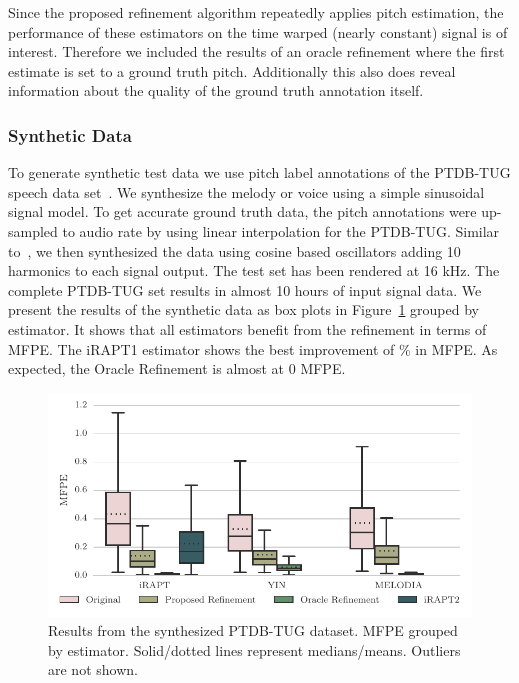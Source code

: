 %
Since the proposed refinement algorithm repeatedly applies pitch estimation, the performance of these estimators on the time warped (nearly constant) signal is of interest. Therefore we included the results of an oracle refinement where the first estimate is set to a ground truth pitch. Additionally this also does reveal information about the quality of the ground truth annotation itself.

\vspace{-0.6em}
\subsubsection{Synthetic Data} %
\label{ssub:sythetic_data}

To generate synthetic test data we use pitch label annotations of the PTDB-TUG speech data set~\cite{pirker2011pitch}. We synthesize the melody or voice using a simple sinusoidal signal model. To get accurate ground truth data, the pitch annotations were up-sampled to audio rate by using linear interpolation for the PTDB-TUG. Similar to~\cite{mauch2014pyin}, we then synthesized the data using cosine based oscillators adding 10 harmonics to each signal output.
The test set has been rendered at 16 kHz. The complete PTDB-TUG set results in almost 10 hours of input signal data.
We present the results of the synthetic data as box plots in Figure~\ref{fig:ptdbtug_synth} grouped by estimator. It shows that all estimators benefit from the refinement in terms of MFPE. The iRAPT1 estimator shows the best improvement of \ptdbtugsynthiRAPTIMPROMFPE \% in MFPE. As expected, the Oracle Refinement is almost at 0 MFPE.

\begin{figure}[t!]
\centering
		\includegraphics[width=0.90\columnwidth]{Chapters/05_Separation_Known/figures/stats_boxplot_ptdb_synth.pdf}
\caption{Results from the synthesized PTDB-TUG dataset. MFPE grouped by estimator. Solid/dotted lines represent medians/means. Outliers are not shown.}
\label{fig:ptdbtug_synth}
\end{figure}

